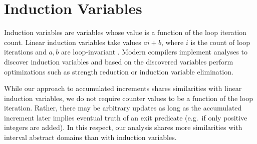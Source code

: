 \section{Induction Variables}

Induction variables are variables whose value is a function of the loop iteration count. Linear induction variables take values $a i + b$, where $i$ is the count of loop iterations and $a, b$ are loop-invariant \cite{DBLP:books/aw/AhoSU86}. Modern compilers implement analyses to discover induction variables and based on the discovered variables perform optimizations such as strength reduction or induction variable elimination.

While our approach to accumulated increments shares similarities with linear induction variables, we do not require counter values to be a function of the loop iteration. Rather, there may be arbitrary updates as long as the accumulated increment later implies eventual truth of an exit predicate (e.g.\ if only positive integers are added). In this respect, our analysis shares more similarities with interval abstract domains \cite{DBLP:conf/popl/CousotC77} than with induction variables.
